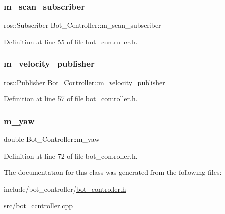 \subsubsection{\texorpdfstring{m\+\_\+scan\+\_\+subscriber}{m\_scan\_subscriber}}
{\footnotesize\ttfamily ros\+::\+Subscriber Bot\+\_\+\+Controller\+::m\+\_\+scan\+\_\+subscriber\hspace{0.3cm}{\ttfamily [protected]}}



Definition at line 55 of file bot\+\_\+controller.\+h.

\mbox{\label{class_bot___controller_a4ffa549048f2deb56585dccb829bc799}} 
\subsubsection{\texorpdfstring{m\+\_\+velocity\+\_\+publisher}{m\_velocity\_publisher}}
{\footnotesize\ttfamily ros\+::\+Publisher Bot\+\_\+\+Controller\+::m\+\_\+velocity\+\_\+publisher\hspace{0.3cm}{\ttfamily [protected]}}



Definition at line 57 of file bot\+\_\+controller.\+h.

\mbox{\label{class_bot___controller_a86f4b79640605ce24d6ced079bb61d46}} 
\subsubsection{\texorpdfstring{m\+\_\+yaw}{m\_yaw}}
{\footnotesize\ttfamily double Bot\+\_\+\+Controller\+::m\+\_\+yaw\hspace{0.3cm}{\ttfamily [protected]}}



Definition at line 72 of file bot\+\_\+controller.\+h.



The documentation for this class was generated from the following files\+:\begin{DoxyCompactItemize}
\item 
include/bot\+\_\+controller/\hyperlink{bot__controller_8h}{bot\+\_\+controller.\+h}\item 
src/\hyperlink{bot__controller_8cpp}{bot\+\_\+controller.\+cpp}\end{DoxyCompactItemize}
